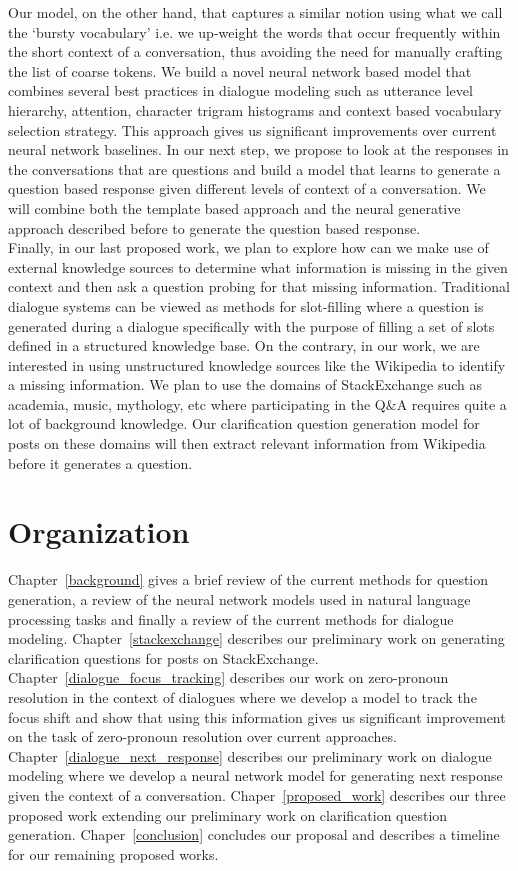 \documentclass[11pt]{report}
\begin{document}
\noindent
Our model, on the other hand, that captures a similar notion using what we call the `bursty vocabulary' i.e. we up-weight the words that occur frequently within the short context of a conversation, thus avoiding the need for manually crafting the list of coarse tokens. We build a novel neural network based model that combines several best practices in dialogue modeling such as utterance level hierarchy, attention, character trigram histograms and context based vocabulary selection strategy. This approach gives us significant improvements over current neural network baselines. In our next step, we propose to look at the responses in the conversations that are questions and build a model that learns to generate a question based response given different levels of context of a conversation. We will combine both the template based approach and the neural generative approach described before to generate the question based response. \\

\noindent
Finally, in our last proposed work, we plan to explore how can we make use of external knowledge sources to determine what information is missing in the given context and then ask a question probing for that missing information. Traditional dialogue systems \cite{} can be viewed as methods for slot-filling where a question is generated during a dialogue specifically with the purpose of filling a set of slots defined in a structured knowledge base. On the contrary, in our work, we are interested in using unstructured knowledge sources like the Wikipedia to identify a missing information. We plan to use the domains of StackExchange such as academia, music, mythology, etc where participating in the Q\&A requires quite a lot of background knowledge. Our clarification question generation model for posts on these domains will then extract relevant information from Wikipedia before it generates a question. 

\section{Organization}

Chapter~\ref{background} gives a brief review of the current methods for question generation, a review of the neural network models used in natural language processing tasks and finally a review of the current methods for dialogue modeling. Chapter~\ref{stackexchange} describes our preliminary work on generating clarification questions for posts on StackExchange. Chapter~\ref{dialogue_focus_tracking} describes our work on zero-pronoun resolution in the context of dialogues where we develop a model to track the focus shift and show that using this information gives us significant improvement on the task of zero-pronoun resolution over current approaches. Chapter~\ref{dialogue_next_response} describes our preliminary work on dialogue modeling where we develop a neural network model for generating next response given the context of a conversation. Chaper~\ref{proposed_work} describes our three proposed work extending our preliminary work on clarification question generation. Chaper~\ref{conclusion} concludes our proposal and describes a timeline for our remaining proposed works.
\end{document}
